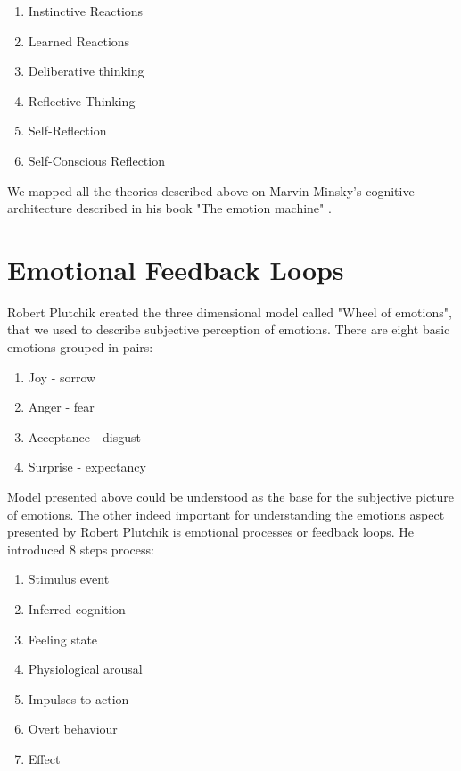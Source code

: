 \begin{enumerate}
 \item Instinctive Reactions
 \item Learned Reactions
 \item Deliberative thinking 
 \item Reflective Thinking
 \item Self-Reflection
 \item Self-Conscious Reflection
\end{enumerate}

We mapped all the theories described above on Marvin Minsky's cognitive architecture described in his book "The emotion machine" \cite{emotionmachine}.

\section{Emotional Feedback Loops}
\label{sec:feedback_loops}

Robert Plutchik created the three dimensional model \cite{natureofemotions} called "Wheel of emotions", that we used to describe subjective perception of emotions. There are eight basic emotions grouped in pairs:

\begin{enumerate}
 \item  Joy - sorrow
 \item  Anger - fear
 \item  Acceptance - disgust
 \item  Surprise - expectancy
\end{enumerate}

Model presented above could be understood as the base for the subjective picture of emotions. The other indeed important for understanding the emotions aspect presented by Robert Plutchik is emotional processes or feedback loops. He introduced 8 steps process:

\begin{enumerate}
 \item{Stimulus event}
 \item{Inferred cognition}
 \item{Feeling state}
 \item{Physiological arousal}
 \item{Impulses to action}
 \item{Overt behaviour}
 \item{Effect}
\end{enumerate}

